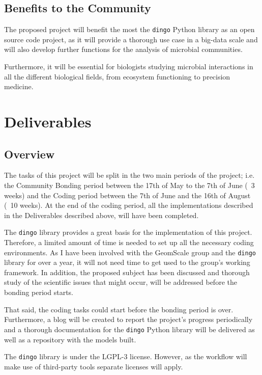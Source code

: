\documentclass{article}
\begin{document}
\subsection{Benefits to the Community}

The proposed project will benefit the most the \texttt{dingo} Python library 
as an open source code project, as it will provide a thorough use case in a big-data scale and 
will also develop further functions for the analysis of microbial communities. 

Furthermore, it will be essential for biologists studying microbial interactions in all the different biological fields, from ecosystem functioning to precision medicine. 


\section{Deliverables}
\subsection{Overview}
The tasks of this project will be split in the two main periods of the project; i.e. the Community Bonding period between the 17th of May to the 7th of June (~3 weeks) and the Coding period between the 7th of June and the 16th of August (~10 weeks). 
At the end of the coding period, all the implementations described in the Deliverables described above, will have been completed. 

The \texttt{dingo} library provides a great basis for the implementation of this project. 
Therefore, a limited amount of time is needed  to set up all the necessary coding environments. 
As I have been involved with the GeomScale group and the \texttt{dingo} library for over a year, it will not need time to get used to the group's working framework.
In addition, the proposed subject has been discussed and thorough study of the 
scientific issues that might occur, will be addressed before the bonding period starts.

That said, the coding tasks could start before the bonding period is over. 
Furthermore, a blog will be created to report the project’s progress periodically and a thorough documentation for the \texttt{dingo} Python library will be delivered
as well as a repository with the models built.

The \texttt{dingo} library is under the LGPL-3 license. 
However, as the workflow will make use of third-party tools separate licenses will apply.
\end{document}
